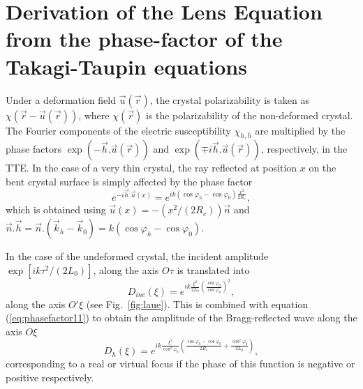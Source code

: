 \documentclass[preprint]{iucr}              %
\newcommand{\inred}[1]{{\color{red}#1}}
\begin{document}






\appendix
\section{\inred{Derivation of the} Lens Equation from the phase-factor of the Takagi-Taupin equations}
\label{appendix:CLE}

\inred{Under} a deformation field $\vec u(\vec r)$, the crystal polarizability \inred{is} taken as 
$\chi(\vec r-\vec u(\vec r))$, where $\chi(\vec r)$ is the
polarizability of the non-deformed crystal. The Fourier components of the electric susceptibility $\chi_{h,\bar h}$ are multiplied by the phase factors $\exp(-  \vec h . \vec u (\vec r))$ and $\exp(\mp i \vec h . \vec u (\vec r))$, respectively, in the TTE.
In the case of a very thin crystal, the ray \inred{reflected at position} $x$ on the \inred{bent} crystal surface is simply affected by the phase factor 
\begin{equation}
    \label{eq:phasefactor11}
    e^{-i \vec h . \vec u(x)} = e^{i k (\cos\varphi_h-\cos\varphi_0) \frac{x^2}{2 R_c} },
\end{equation}
which is obtained using $\vec u(x) = -(x^2/(2R_c))\vec n$ and $\vec n . \vec h = \vec n.(\vec k_h - \vec k_0) = k(\cos\varphi_h-\cos\varphi_0)$. 

\inred{In the case of the undeformed crystal, the incident \inred{amplitude} $\exp[i k \tau^2 / (2L_0)]$, \inred{along the axis} $O\tau$ 
is translated into 
\begin{equation}
    D_{inc}(\xi) = e^{i k \frac{\xi^2}{2L_0}\left(\frac{\cos\varphi_0}{\cos\varphi_h}\right)^2},
\end{equation}
along the axis $O'\xi$ (see Fig.~\ref{fig:laue}).
This is combined with equation (\ref{eq:phasefactor11}) to obtain} the amplitude of the Bragg-reflected wave along the axis $O\xi$
\begin{equation}
\label{eq:A4}
    D_h(\xi) = e^{i k
    \frac{\xi^2}{\cos^2\varphi_h}\left(\frac{\cos\varphi_h-\cos\varphi_0}{2R_c} + \frac{\cos^2\varphi_0}{2L_0}\right)},
\end{equation}
corresponding to a real or virtual focus if the phase of this function is negative or positive respectively. 
\end{document}
